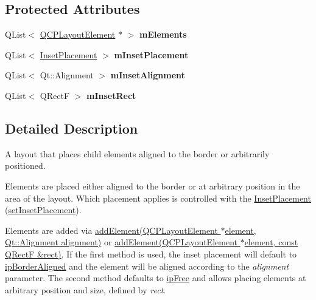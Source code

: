 \subsection*{\-Protected \-Attributes}
\begin{DoxyCompactItemize}
\item 
\hypertarget{classQCPLayoutInset_a8fff7eae9a1be9a5c1e544fb379f682f}{\-Q\-List$<$ \hyperlink{classQCPLayoutElement}{\-Q\-C\-P\-Layout\-Element} $\ast$ $>$ {\bfseries m\-Elements}}\label{classQCPLayoutInset_a8fff7eae9a1be9a5c1e544fb379f682f}

\item 
\hypertarget{classQCPLayoutInset_a57a0a4e445cc78eada29765ecf092abe}{\-Q\-List$<$ \hyperlink{classQCPLayoutInset_a8b9e17d9a2768293d2a7d72f5e298192}{\-Inset\-Placement} $>$ {\bfseries m\-Inset\-Placement}}\label{classQCPLayoutInset_a57a0a4e445cc78eada29765ecf092abe}

\item 
\hypertarget{classQCPLayoutInset_a55e9b84c310136ff985a6544184ab64a}{\-Q\-List$<$ \-Qt\-::\-Alignment $>$ {\bfseries m\-Inset\-Alignment}}\label{classQCPLayoutInset_a55e9b84c310136ff985a6544184ab64a}

\item 
\hypertarget{classQCPLayoutInset_aaa8f6b5029458f3d97a65239524a2b33}{\-Q\-List$<$ \-Q\-Rect\-F $>$ {\bfseries m\-Inset\-Rect}}\label{classQCPLayoutInset_aaa8f6b5029458f3d97a65239524a2b33}

\end{DoxyCompactItemize}


\subsection{\-Detailed \-Description}
\-A layout that places child elements aligned to the border or arbitrarily positioned. 

\-Elements are placed either aligned to the border or at arbitrary position in the area of the layout. \-Which placement applies is controlled with the \hyperlink{classQCPLayoutInset_a8b9e17d9a2768293d2a7d72f5e298192}{\-Inset\-Placement} (\hyperlink{classQCPLayoutInset_a63298830744d5d8c5345511c00fd2144}{set\-Inset\-Placement}).

\-Elements are added via \hyperlink{classQCPLayoutInset_ad61529eb576af7f04dff94abb10c745a}{add\-Element(\-Q\-C\-P\-Layout\-Element $\ast$element, Qt\-::\-Alignment alignment)} or \hyperlink{classQCPLayoutInset_a8ff61fbee4a1f0ff45c398009d9f1e56}{add\-Element(\-Q\-C\-P\-Layout\-Element $\ast$element, const Q\-Rect\-F \&rect)}. \-If the first method is used, the inset placement will default to \hyperlink{classQCPLayoutInset_a8b9e17d9a2768293d2a7d72f5e298192aa81e7df4a785ddee2229a8f47c46e817}{ip\-Border\-Aligned} and the element will be aligned according to the {\itshape alignment\/} parameter. \-The second method defaults to \hyperlink{classQCPLayoutInset_a8b9e17d9a2768293d2a7d72f5e298192aa4802986ea2cea457f932b115acba59e}{ip\-Free} and allows placing elements at arbitrary position and size, defined by {\itshape rect\/}.


